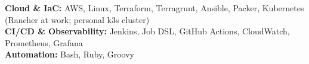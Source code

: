 
\begin{cvparagraph}
  \textbf{Cloud \& IaC:} AWS, Linux, Terraform, Terragrunt, Ansible, Packer, Kubernetes (Rancher at work; personal k3s cluster)\\
  \textbf{CI/CD \& Observability:} Jenkins, Job DSL, GitHub Actions, CloudWatch, Prometheus, Grafana\\
  \textbf{Automation:} Bash, Ruby, Groovy
\end{cvparagraph}
